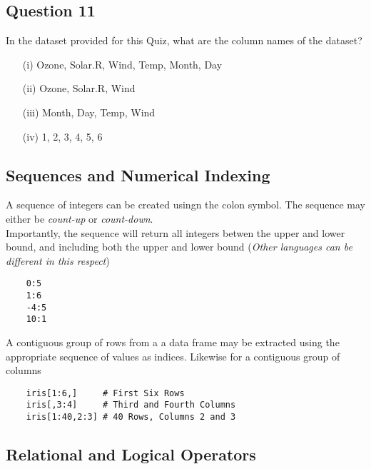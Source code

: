 \documentclass[12pt]{article}
\begin{document}
\newpage
\subsection*{Question 11}
\Large
In the dataset provided for this Quiz, what are the column names of the dataset?
\begin{itemize} 
\item[(i)] Ozone, Solar.R, Wind, Temp, Month, Day
\item[(ii)] Ozone, Solar.R, Wind
\item[(iii)] Month, Day, Temp, Wind
\item[(iv)] 1, 2, 3, 4, 5, 6
\end{itemize}

\newpage
\subsection*{Sequences and Numerical Indexing}
\Large

A sequence of integers can be created usingn the colon symbol. The sequence may either be \textit{count-up} or \textit{count-down}.
\\
Importantly, the sequence will return all integers betwen the upper and lower bound, and including both the upper and lower bound (\textit{Other languages can be different in this respect})
\begin{framed}
	\begin{verbatim}
	0:5
	1:6
	-4:5
	10:1
	\end{verbatim}
\end{framed}

\noindent A contiguous group of rows from a a data frame may be extracted using the appropriate sequence of values as indices. Likewise for a contiguous group of columns

\begin{framed}
	\begin{verbatim}
	iris[1:6,]     # First Six Rows
	iris[,3:4]     # Third and Fourth Columns
	iris[1:40,2:3] # 40 Rows, Columns 2 and 3
	\end{verbatim}
\end{framed}

\subsection{Relational and Logical Operators}
\end{document}
